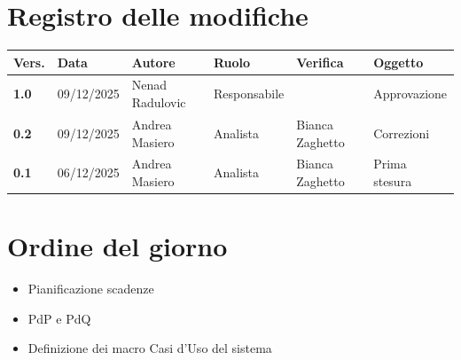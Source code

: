 \documentclass[a4paper,12pt]{article}
\begin{document}
    

    \newpage
    \section*{Registro delle modifiche}

    \begin{table}[h!]
        \begin{tabularx}{\textwidth}{|l|l|l|l|X|X|}
            \hline
            \textbf{Vers.} & \textbf{Data} & \textbf{Autore} & \textbf{Ruolo} & \textbf{Verifica} & \textbf{Oggetto} \\
            \hline
            \textbf{1.0} & 09/12/2025 & Nenad Radulovic & Responsabile &  & Approvazione \\
            \hline
            \textbf{0.2} & 09/12/2025 & Andrea Masiero & Analista & Bianca Zaghetto & Correzioni \\
            \hline
            \textbf{0.1} & 06/12/2025 & Andrea Masiero & Analista & Bianca Zaghetto & Prima stesura \\
        \hline
        \end{tabularx}
    \end{table}

    \newpage
    \tableofcontents
    \newpage

    \section{Ordine del giorno} {
        \begin{itemize}
            \item Pianificazione scadenze
            \item PdP e PdQ
            \item Definizione dei macro
Casi d’Uso del sistema
        \end{itemize}
    }
\end{document}
